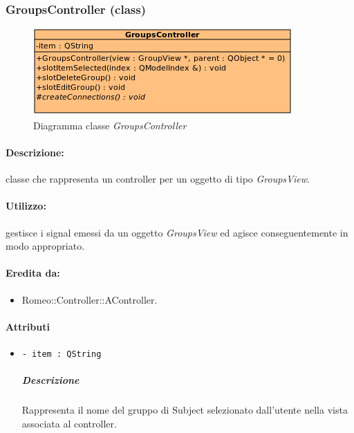 	\subsubsection{GroupsController (class)}
	\begin{figure}[!h]
		\centering
		\includegraphics[scale=2.75]{./Content/Immagini/controller/GroupsController}
		\caption{Diagramma classe \textsl{GroupsController}}
	\end{figure}
	\paragraph{Descrizione:} classe che rappresenta un controller per un oggetto di tipo \textsl{GroupsView}.
	\paragraph{Utilizzo:} gestisce i signal\g{} emessi da un oggetto \textsl{GroupsView} ed agisce conseguentemente in modo appropriato.
	\paragraph{Eredita da:}
		\begin{itemize}
			\item Romeo::Controller::AController.
		\end{itemize}
	\paragraph{Attributi}
		\begin{itemize}
			\item \color{teal} \verb!- item : QString!
			\color{black}
			\subparagraph{Descrizione} Rappresenta il nome del gruppo di Subject\g{} selezionato dall'utente nella vista associata al controller.
		\end{itemize}
